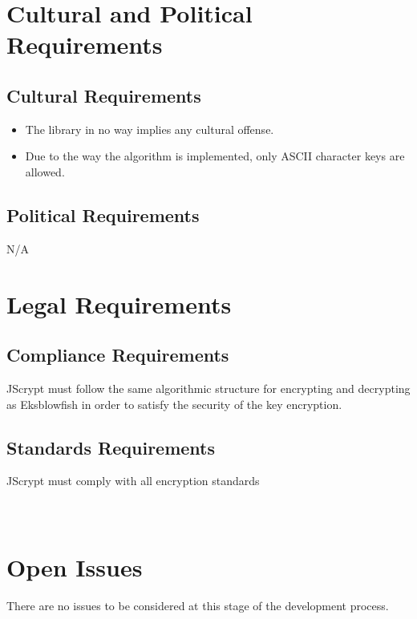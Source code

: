 \documentclass[12pt]{article}
\begin{document}
\section {Cultural and Political Requirements}

\subsection {Cultural Requirements}
\begin{itemize}
  \item The library in no way implies any cultural offense.
  \item Due to the way the algorithm is implemented, only ASCII character keys are allowed.
  \end{itemize}

\subsection {Political Requirements}
N/A

\section {Legal Requirements}

\subsection {Compliance Requirements}
JScrypt must follow the same algorithmic structure for encrypting and decrypting as Eksblowfish in order to satisfy the security of the key encryption.

\subsection {Standards Requirements}
JScrypt must comply with all encryption standards \\ \\ \\

\section*{}

\section {Open Issues}
There are no issues to be considered at this stage of the development process.
\end{document}
